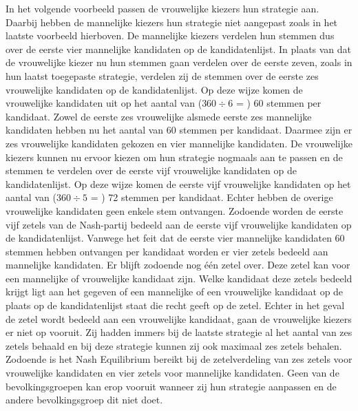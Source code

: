 \indent In het volgende voorbeeld passen de vrouwelijke kiezers hun strategie aan. Daarbij hebben de mannelijke kiezers hun strategie niet aangepast zoals in het laatste voorbeeld hierboven. De mannelijke kiezers verdelen hun stemmen dus over de eerste vier mannelijke kandidaten op de kandidatenlijst. In plaats van dat de vrouwelijke kiezer nu hun stemmen gaan verdelen over de eerste zeven, zoals in hun laatst toegepaste strategie, verdelen zij de stemmen over de eerste zes vrouwelijke kandidaten op de kandidatenlijst. Op deze wijze komen de vrouwelijke kandidaten uit op het aantal van ($360\div6$ = ) 60 stemmen per kandidaat. Zowel de eerste zes vrouwelijke alsmede eerste zes mannelijke kandidaten hebben nu het aantal van 60 stemmen per kandidaat. Daarmee zijn er zes vrouwelijke kandidaten gekozen en vier mannelijke kandidaten. De vrouwelijke kiezers kunnen nu ervoor kiezen om hun strategie nogmaals aan te passen en de stemmen te verdelen over de eerste vijf vrouwelijke kandidaten op de kandidatenlijst. Op deze wijze komen de eerste vijf vrouwelijke kandidaten op het aantal van ($360\div5$ = ) 72 stemmen per kandidaat. Echter hebben de overige vrouwelijke kandidaten geen enkele stem ontvangen. Zodoende worden de eerste vijf zetels van de Nash-partij bedeeld aan de eerste vijf vrouwelijke kandidaten op de kandidatenlijst. Vanwege het feit dat de eerste vier mannelijke kandidaten 60 stemmen hebben ontvangen per kandidaat worden er vier zetels bedeeld aan mannelijke kandidaten. Er blijft zodoende nog één zetel over. Deze zetel kan voor een mannelijke of vrouwelijke kandidaat zijn. Welke kandidaat deze zetels bedeeld krijgt ligt aan het gegeven of een mannelijke of een vrouwelijke kandidaat op de plaats op de kandidatenlijst staat die recht geeft op de zetel. Echter in het geval de zetel wordt bedeeld aan een vrouwelijke kandidaat, gaan de vrouwelijke kiezers er niet op vooruit. Zij hadden immers bij de laatste strategie al het aantal van zes zetels behaald en bij deze strategie kunnen zij ook maximaal zes zetels behalen. \\
\indent Zodoende is het Nash Equilibrium bereikt bij de zetelverdeling van zes zetels voor vrouwelijke kandidaten en vier zetels voor mannelijke kandidaten. Geen van de bevolkingsgroepen kan erop vooruit wanneer zij hun strategie aanpassen en de andere bevolkingsgroep dit niet doet.



